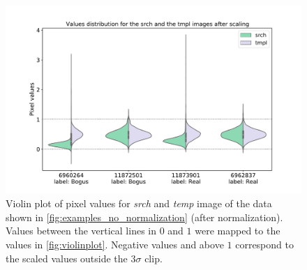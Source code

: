 \begin{figure}
    \centering
    \includegraphics[width=0.6\linewidth]{
    figures/violin_plot_scaling.pdf}
    \caption{Violin plot of pixel values for \textit{srch} and \textit{temp} image of %
    the data shown in \autoref{fig:examples_no_normalization} (after normalization). Values between the vertical lines in $0$ and $1$ were mapped to the values in \autoref{fig:violinplot}. Negative values and above $1$ correspond to the scaled values outside the $3\sigma$ clip. }
    \label{fig:violinplotscaling}
\end{figure}

\clearpage



